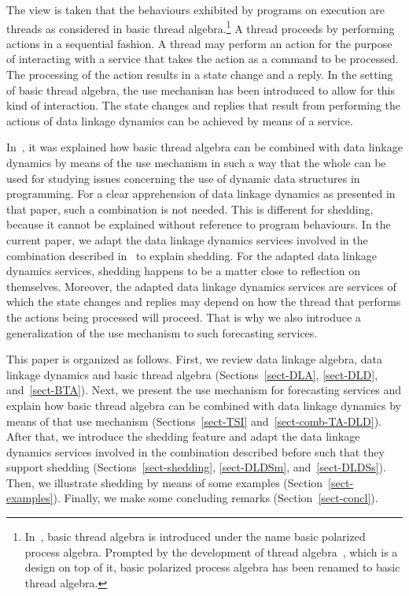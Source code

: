 \documentclass[fleqn]{llncs}
\begin{document}
The view is taken that the behaviours exhibited by programs on execution
are threads as considered in basic thread algebra.\footnote
{In~\cite{BL02a}, basic thread algebra is introduced under the name
 basic polarized process algebra.
 Prompted by the development of thread algebra~\cite{BM04c}, which is a
 design on top of it, basic polarized process algebra has been renamed
 to basic thread algebra.
}
A thread proceeds by performing actions in a sequential fashion.
A thread may perform an action for the purpose of interacting with a
service that takes the action as a command to be processed.
The processing of the action results in a state change and a reply.
In the setting of basic thread algebra, the use mechanism has been
introduced to allow for this kind of interaction.
The state changes and replies that result from performing the actions
of data linkage dynamics can be achieved by means of a service.

In~\cite{BM08d}, it was explained how basic thread algebra can be
combined with data linkage dynamics by means of the use mechanism in
such a way that the whole can be used for studying issues concerning the
use of dynamic data structures in programming.
For a clear apprehension of data linkage dynamics as presented
in that paper, such a combination is not needed.
This is different for shedding, because it cannot be explained without
reference to program behaviours.
In the current paper, we adapt the data linkage dynamics services
involved in the combination described in~\cite{BM08d} to explain
shedding.
For the adapted data linkage dynamics services, shedding happens to be a
matter close to reflection on themselves.
Moreover, the adapted data linkage dynamics services are services of
which the state changes and replies may depend on how the thread that
performs the actions being processed will proceed.
That is why we also introduce a generalization of the use mechanism to
such forecasting services.

This paper is organized as follows.
First, we review data linkage algebra, data linkage dynamics and basic
thread algebra
(Sections~\ref{sect-DLA}, \ref{sect-DLD}, and~\ref{sect-BTA}).
Next, we present the use mechanism for forecasting services and explain
how basic thread algebra can be combined with data linkage dynamics by
means of that use mechanism
(Sections~\ref{sect-TSI} and~\ref{sect-comb-TA-DLD}).
After that, we introduce the shedding feature and adapt the data linkage
dynamics services involved in the combination described before such that
they support shedding
(Sections~\ref{sect-shedding}, \ref{sect-DLDSm}, and~\ref{sect-DLDSs}).
Then, we illustrate shedding by means of some examples
(Section~\ref{sect-examples}).
Finally, we make some concluding remarks (Section~\ref{sect-concl}).
\end{document}
